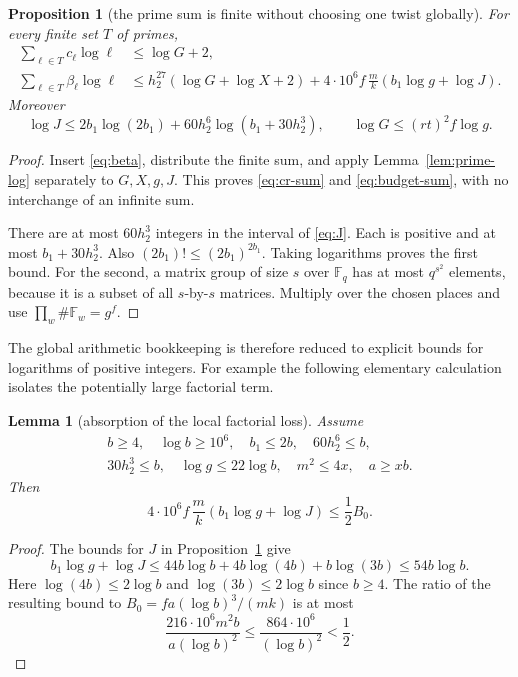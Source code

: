 \documentclass[11pt,a4paper]{article}
\newtheorem{proposition}[theorem]{Proposition}
\newtheorem{lemma}[theorem]{Lemma}
\theoremstyle{definition}
\newcommand{\F}{\mathbb F}
\begin{document}
\begin{proposition}[the prime sum is finite without choosing one twist globally]
\label{prop:budget}
For every finite set \(T\) of primes,
\begin{align}
 \sum_{\ell\in T}c_\ell\log\ell&\le\log G+2,             \label{eq:cr-sum}\\
 \sum_{\ell\in T}\beta_\ell\log\ell
 &\le h_2^{27}(\log G+\log X+2)
       +4\cdot10^6f\,\frac m k(b_1\log g+\log J).       \label{eq:budget-sum}
\end{align}
Moreover
\[
 \log J\le
 2b_1\log(2b_1)+60h_2^6\log(b_1+30h_2^3),
 \qquad
 \log G\le (rt)^2 f\log g .
\]
\end{proposition}
\begin{proof}
Insert \eqref{eq:beta}, distribute the finite sum, and apply
Lemma~\ref{lem:prime-log} separately to \(G,X,g,J\).
This proves \eqref{eq:cr-sum} and \eqref{eq:budget-sum}, with no interchange
of an infinite sum.

There are at most \(60h_2^3\) integers in the interval of \eqref{eq:J}.
Each is positive and at most \(b_1+30h_2^3\).
Also \((2b_1)!\le(2b_1)^{2b_1}\). Taking logarithms proves the first bound.
For the second, a matrix group of size \(s\) over \(\F_q\) has at most
\(q^{s^2}\) elements, because it is a subset of all \(s\)-by-\(s\) matrices.
Multiply over the chosen places and use
\(\prod_w\#\F_w=g^f\).
\end{proof}

The global arithmetic bookkeeping is therefore reduced to explicit bounds
for logarithms of positive integers. For example the following elementary
calculation isolates the potentially large factorial term.

\begin{lemma}[absorption of the local factorial loss]\label{lem:factorial-budget}
Assume
\[
 \begin{gathered}
 b\ge4,\quad \log b\ge10^6,\quad b_1\le2b,\quad 60h_2^6\le b,\\
 30h_2^3\le b,\quad \log g\le22\log b,\quad m^2\le4x,\quad a\ge xb .
 \end{gathered}
\]
Then
\[
 4\cdot10^6 f\,\frac m k(b_1\log g+\log J)\le \frac12 B_0 .
\]
\end{lemma}
\begin{proof}
The bounds for \(J\) in Proposition~\ref{prop:budget} give
\[
 b_1\log g+\log J
 \le 44b\log b+4b\log(4b)+b\log(3b)\le54b\log b.
\]
Here \(\log(4b)\le2\log b\) and \(\log(3b)\le2\log b\) since \(b\ge4\).
The ratio of the resulting bound to \(B_0=f a(\log b)^3/(mk)\) is at most
\[
 \frac{216\cdot10^6 m^2b}{a(\log b)^2}
 \le \frac{864\cdot10^6}{(\log b)^2}<\frac12 .
\]
\end{proof}
\end{document}
